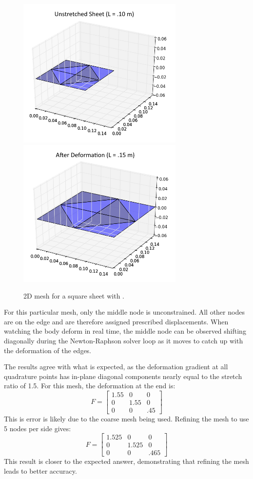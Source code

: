 \documentclass[]{spie}  %
\begin{document}
\begin{figure}[h]
	\centering
	\includegraphics[width=3.25in]{unstretched_sheet.png} \quad
	\includegraphics[width=3.25in]{stretched_sheet.png} 
	\caption{2D mesh for a square sheet with .} 
	\label{fig: stretched sheet}
\end{figure}

For this particular mesh, only the middle node is unconstrained. All other nodes are on the edge and are therefore assigned prescribed displacements. When watching the body deform in real time, the middle node can be observed shifting diagonally during the Newton-Raphson solver loop as it moves to catch up with the deformation of the edges. 

The results agree with what is expected, as the deformation gradient at all quadrature points has in-plane diagonal components nearly equal to the stretch ratio of 1.5. For this mesh, the deformation at the end is:
\begin{equation}
F = 
\begin{bmatrix}
1.55 & 0 & 0 \\
0 & 1.55 & 0 \\
0 & 0 & .45
\end{bmatrix}
\end{equation}
This is error is likely due to the coarse mesh being used. Refining the mesh to use 5 nodes per side gives:
\begin{equation}
F = 
\begin{bmatrix}
1.525 & 0 & 0 \\
0 & 1.525 & 0 \\
0 & 0 & .465
\end{bmatrix}
\end{equation}
This result is closer to the expected answer, demonstrating that refining the mesh leads to better accuracy. 
\end{document}
